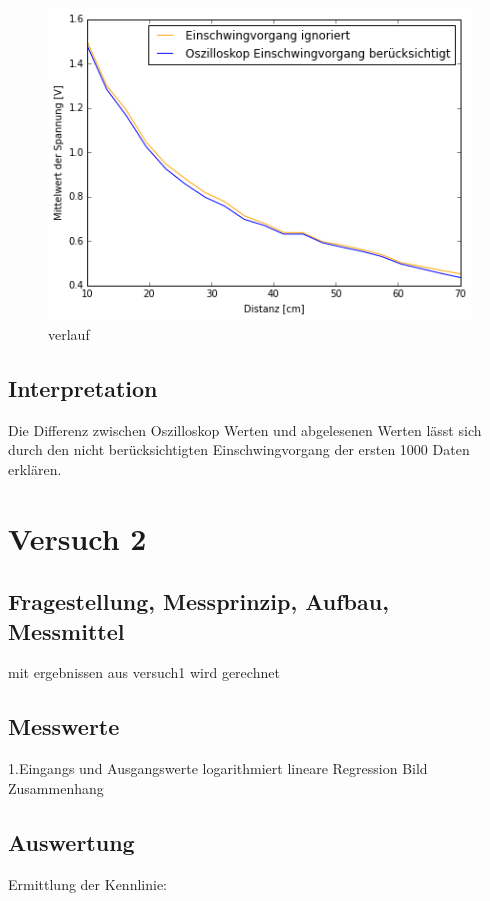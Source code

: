 \documentclass[12pt,oneside,a4paper]{report}
\begin{document}
\begin{figure}[H]
	\centering\small
	\includegraphics[width=\textwidth]{src/Diagramm1.png}
	\caption{verlauf}
	\label{fig:Diagramm1}
\end{figure}	

\section{Interpretation}
\label{chap:VERSUCH_1_INTERPRETATION}
Die Differenz zwischen Oszilloskop Werten und abgelesenen Werten lässt sich durch den nicht berücksichtigten Einschwingvorgang der ersten 1000 Daten erklären.


%
%
\chapter{Versuch 2}
\label{chap:VERSUCH_2}


\section{Fragestellung, Messprinzip, Aufbau, Messmittel}
\label{chap:VERSUCH_2_FRAGESTELLUNG}
mit ergebnissen aus versuch1 wird gerechnet

\section{Messwerte}
\label{chap:VERSUCH_2_MESSWERTE}
1.Eingangs und Ausgangswerte logarithmiert
  lineare Regression
  Bild Zusammenhang
  
\section{Auswertung}
\label{chap:VERSUCH_2_AUSWERTUNG}
Ermittlung der Kennlinie:
\end{document}
